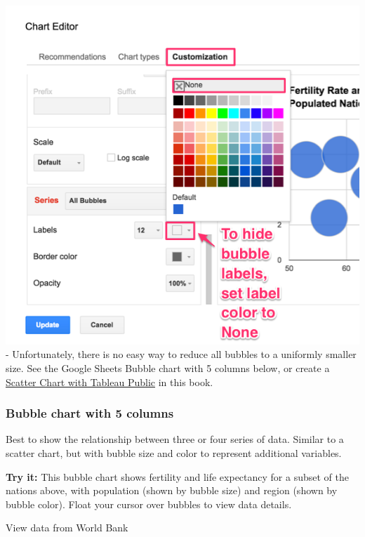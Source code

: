 \documentclass[
  english,
]{book}
\begin{document}
\includegraphics{images/05-chart/bubble-chart-hide-labels.png}
- Unfortunately, there is no easy way to reduce all bubbles to a uniformly smaller size. See the Google Sheets Bubble chart with 5 columns below, or create a \href{chart.html\#scatter-chart-with-tableau-public}{Scatter Chart with Tableau Public} in this book.

\hypertarget{bubble-chart-with-5-columns}{%
\subsubsection*{Bubble chart with 5 columns}\label{bubble-chart-with-5-columns}}

Best to show the relationship between three or four series of data. Similar to a scatter chart, but with bubble size and color to represent additional variables.

\textbf{Try it:} This bubble chart shows fertility and life expectancy for a subset of the nations above, with population (shown by bubble size) and region (shown by bubble color). Float your cursor over bubbles to view data details.

View data from World Bank
\end{document}
